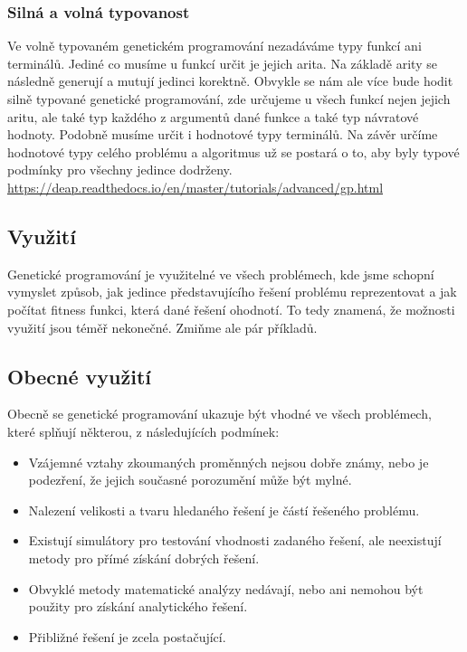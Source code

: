 \subsubsection{Silná a volná typovanost}
Ve volně typovaném genetickém programování nezadáváme typy funkcí ani terminálů. Jediné co musíme u funkcí určit je jejich arita. Na základě arity se následně generují a mutují jedinci korektně.
Obvykle se nám ale více bude hodit silně typované genetické programování, zde určujeme u všech funkcí nejen jejich aritu, ale také typ každého z argumentů dané funkce a také typ návratové hodnoty.
Podobně musíme určit i hodnotové typy terminálů.
Na závěr určíme hodnotové typy celého problému a algoritmus už se postará o to, aby byly typové podmínky pro všechny jedince dodrženy.
\url{https://deap.readthedocs.io/en/master/tutorials/advanced/gp.html}


\subsection{Využití}
Genetické programování je využitelné ve všech problémech, kde jsme schopní vymyslet způsob, jak jedince představujícího řešení problému reprezentovat a jak počítat fitness funkci, která dané řešení ohodnotí.
To tedy znamená, že možnosti využití jsou téměř nekonečné. Zmiňme ale pár příkladů. 

\subsection{Obecné využití}
Obecně se genetické programování ukazuje být vhodné ve všech problémech, které splňují některou, z následujících podmínek:

\begin{itemize}
    \item Vzájemné vztahy zkoumaných proměnných nejsou dobře známy, nebo je podezření, že jejich současné porozumění může být mylné.
    \item Nalezení velikosti a tvaru hledaného řešení je částí řešeného problému.
    \item Existují simulátory pro testování vhodnosti zadaného řešení, ale neexistují metody pro přímé získání dobrých řešení.
    \item Obvyklé metody matematické analýzy nedávají, nebo ani nemohou být použity pro získání analytického řešení.
    \item Přibližné řešení je zcela postačující.
    
\end{itemize}



